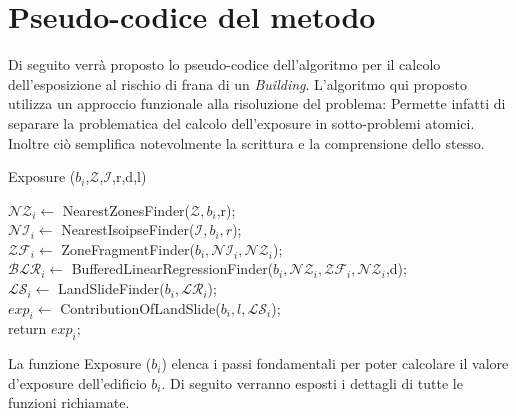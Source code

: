 
\chapter{Pseudo-codice del metodo} %

\label{ch:name} %
Di seguito verrà proposto lo pseudo-codice dell'algoritmo per il calcolo dell'esposizione al rischio di frana di un \textit{Building}. L'algoritmo qui proposto utilizza un approccio funzionale alla risoluzione del problema: Permette infatti di separare la problematica del calcolo dell'exposure in sotto-problemi atomici. Inoltre ciò semplifica notevolmente la scrittura e la comprensione dello stesso.



\begin{algorithm}[H]
	
	
	\IncMargin{1em}
	\caption{Exposure ($b_i$,$\mathcal{Z}$,$\mathcal{I}$,r,d,l)}
	\label{alg:0}
	\BlankLine
	
	\SetAlgoNoLine
	$ \mathcal{NZ}_i \leftarrow$ NearestZonesFinder($\mathcal{Z},b_i$,r); \\
	$ \mathcal{NI}_i \leftarrow$ NearestIsoipseFinder($\mathcal{I},b_i,r$); \\
	$ \mathcal{ZF}_i \leftarrow$ ZoneFragmentFinder($b_i , \mathcal{NI}_i , \mathcal{NZ}_i $);  \\
	$ \mathcal{BLR}_i \leftarrow $ BufferedLinearRegressionFinder($b_i,\mathcal{NZ}_i,\mathcal{ZF}_i,\mathcal{NZ}_i$,d); \\
	$ \mathcal{LS}_i \leftarrow $ LandSlideFinder($b_i , \mathcal{LR}_i $); \\
	$ exp_i \leftarrow$ ContributionOfLandSlide($b_i ,l, \mathcal{LS}_i $);\\
	return $ exp_i $;
	
	
\end{algorithm}
La funzione Exposure ($b_i$) elenca i passi fondamentali per poter calcolare il  valore d'exposure dell'edificio $b_i$. Di seguito verranno esposti i dettagli di tutte le funzioni richiamate.

